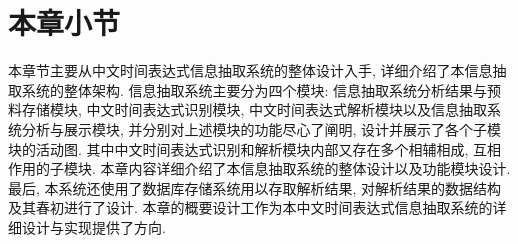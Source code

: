 \section{本章小节}

本章节主要从中文时间表达式信息抽取系统的整体设计入手, 详细介绍了本信息抽取系统的整体架构.
信息抽取系统主要分为四个模块: 信息抽取系统分析结果与预料存储模块, 中文时间表达式识别模块, 中文时间表达式解析模块以及信息抽取系统分析与展示模块, 并分别对上述模块的功能尽心了阐明, 设计并展示了各个子模块的活动图.
其中中文时间表达式识别和解析模块内部又存在多个相辅相成, 互相作用的子模块. 本章内容详细介绍了本信息抽取系统的整体设计以及功能模块设计.
最后, 本系统还使用了数据库存储系统用以存取解析结果, 对解析结果的数据结构及其春初进行了设计. 本章的概要设计工作为本中文时间表达式信息抽取系统的详细设计与实现提供了方向.

